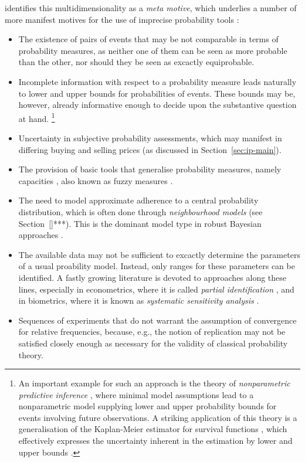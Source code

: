 \textcite[\S 1.4]{2001:weichselberger} identifies this multidimensionality as a \emph{meta motive},
which underlies a number of more manifest motives for the use of imprecise probability tools
\parencite[p~92]{2001:weichselberger}:
\begin{itemize}
\item The existence of pairs of events that may be not comparable in terms of probability measures,
as neither one of them can be seen as more probable than the other,
nor should they be seen as excactly equiprobable.
\item Incomplete information with respect to a probability measure
leads naturally to lower and upper bounds for probabilities of events.
These bounds may be, however, already informative enough to decide upon
the substantive question at hand.%
\footnote{An important example for such an approach is the theory of \emph{nonparametric predictive inference}
\parencite[NPI, see ][]{2011:IESS-npi}, where minimal model assumptions %
lead to a nonparametric model supplying lower and upper probability bounds for events
involving future observations.
A striking application of this theory is a generalisation of the
Kaplan-Meier estimator for survival functions \parencite{1958:kaplan},
which effectively expresses the uncertainty inherent in the estimation
by lower and upper bounds \parencite{2004:Coolen:Yan}.}
\item Uncertainty in subjective probability assessments,
which may manifest in differing buying and selling prices
(as discussed in Section~\ref{sec:ip-main}).
\item The provision of basic tools that generalise probability measures,
namely capacities \parencite{1954:choquet}, also known as fuzzy measures \parencite[e.g.,][]{1989:murofushi}.
\item The need to model approximate adherence to a central probability distribution,
which is often done through \emph{neighbourhood models} (see Section~\ref{}***).
This is the dominant model type in robust Bayesian approaches \parencite[see, e.g.,][]{1994:berger}.
\item The available data may not be sufficient to excactly determine the parameters of a usual proability model.
Instead, only ranges for these parameters can be identified.
A fastly growing literature is devoted to approaches along these lines,
especially in econometrics, where it is called \emph{partial identification} \parencite[e.g.,][]{2003:manski},
and in biometrics, where it is known as \emph{systematic sensitivity analysis} \parencite[e.g.,][]{vansteelandt2006}.
\item Sequences of experiments that do not warrant the assumption of convergence
for relative frequencies, because, e.g., the notion of replication may not be
satisfied closely enough as necessary for the validity of classical probability theory.
\end{itemize}

